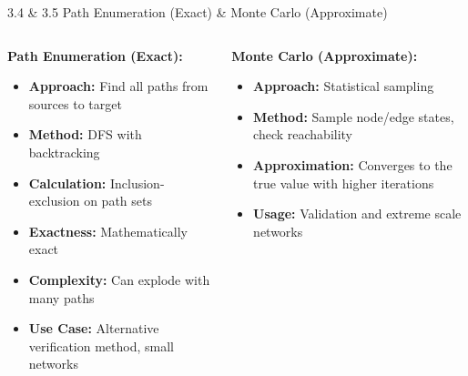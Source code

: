 \documentclass[aspectratio=169]{beamer}
\begin{document}
\begin{frame}{\textcolor{juliapurple}{3.4 \& 3.5 Path Enumeration (Exact) \& Monte Carlo (Approximate)}}
\begin{columns}
\begin{column}{0.50\textwidth}
\textbf{\textcolor{juliagreen}{Path Enumeration (Exact):}}
\begin{itemize}
    \item \textbf{Approach:} Find all paths from sources to target
    \item \textbf{Method:} DFS with backtracking
    \item \textbf{Calculation:} Inclusion-exclusion on path sets
    \item \textbf{Exactness:} Mathematically exact
    \item \textbf{Complexity:} Can explode with many paths
    \item \textbf{Use Case:} Alternative verification method, small networks
\end{itemize}


\end{column}

\begin{column}{0.48\textwidth}
\textbf{\textcolor{juliared}{Monte Carlo (Approximate):}}
\begin{itemize}
    \item \textbf{Approach:} Statistical sampling
    \item \textbf{Method:} Sample node/edge states, check reachability
    \item \textbf{Approximation:} Converges to the true value with higher iterations
    \item \textbf{Usage:} Validation and extreme scale networks
\end{itemize}


\end{column}
\end{columns}
\end{frame}
\end{document}
